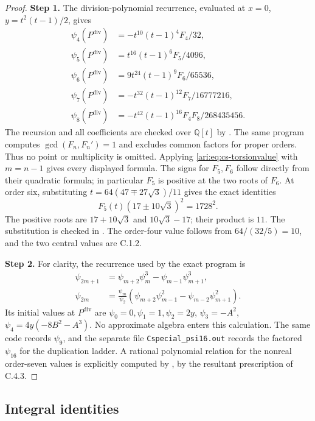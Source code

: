 \documentclass[11pt,a4paper]{article}
\theoremstyle{plain}
\theoremstyle{definition}
\begin{document}
\begin{proof}
\noindent\textbf{Step 1.} The division-polynomial recurrence, evaluated at $x=0$,
$y=t^2(t-1)/2$, gives
\[
 \begin{aligned}
 \psi_4(P^{\mathrm{div}})&=-t^{10}(t-1)^4F_4/32,\\
 \psi_5(P^{\mathrm{div}})&=t^{16}(t-1)^6F_5/4096,\\
 \psi_6(P^{\mathrm{div}})&=9t^{24}(t-1)^9F_6/65536,\\
 \psi_7(P^{\mathrm{div}})&=-t^{32}(t-1)^{12}F_7/16777216,\\
 \psi_8(P^{\mathrm{div}})&=-t^{42}(t-1)^{16}F_4F_8/268435456.
 \end{aligned}
\]
The recursion and all coefficients are checked over $\mathbb Q[t]$
by . The same program computes
$\gcd(F_n,F_n')=1$ and excludes common factors for proper orders.
Thus no point or multiplicity is omitted. Applying
\eqref{ari:eq:cs-torsionvalue} with $m=n-1$ gives every displayed
formula. The signs for $F_5,F_6$ follow directly from their quadratic
formula; in particular $F_5$ is positive at the two roots of $F_6$.
At order six, substituting
$t=64(47\mp27\sqrt3)/11$ gives the exact identities
\[
 F_5(t)(17\pm10\sqrt3)^2=1728^2.
\]
The positive roots are $17+10\sqrt3$ and $10\sqrt3-17$; their
product is $11$. The substitution is checked in
. The order-four value follows from
$64/(32/5)=10$, and the two central values are C.1.2.


\noindent\textbf{Step 2.} For clarity, the recurrence used by the exact program is
\[
 \begin{aligned}
 \psi_{2m+1}&=\psi_{m+2}\psi_m^3-\psi_{m-1}\psi_{m+1}^3,\\
 \psi_{2m}&=\frac{\psi_m}{\psi_2}
   (\psi_{m+2}\psi_{m-1}^2-\psi_{m-2}\psi_{m+1}^2).
 \end{aligned}
\]
Its initial values at $P^{\mathrm{div}}$ are $\psi_0=0,\psi_1=1,\psi_2=2y$,
$\psi_3=-A^2$, $\psi_4=4y(-8B^2-A^3)$. No approximate algebra
enters this calculation. The same code records $\psi_9$, and the
separate file \texttt{Cspecial\_psi16.out} records the factored
$\psi_{16}$ for the duplication ladder. A rational polynomial
relation for the nonreal order-seven values is explicitly computed
by , by the resultant prescription
of C.4.3.
\end{proof}

\subsection{Integral identities}
\end{document}
